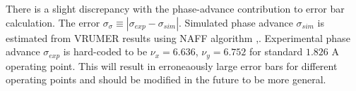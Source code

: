 There is a slight discrepancy with the phase-advance contribution to error bar calculation. 
The error $\sigma_\sigma \equiv | \sigma_{exp} - \sigma_{sim}|$. Simulated phase advance $\sigma_{sim}$ is estimated from VRUMER results using NAFF algorithm \cite{Laskar2003},\cite{Pedro2012}. Experimental phase advance $\sigma_{exp}$ is hard-coded to be $\nu_x = 6.636$, $\nu_y = 6.752$ for standard $1.826$ A operating point.  This will result in erroneaously large error bars for different operating points and should be modified in the future to be more general.





